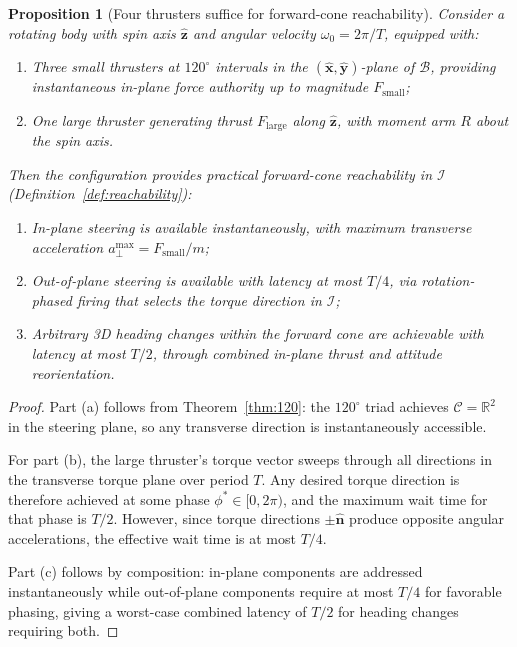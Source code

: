 \documentclass{article}
\newtheorem{proposition}{Proposition}
\begin{document}
\begin{proposition}[Four thrusters suffice for forward-cone reachability]
\label{prop:four_thruster_reachability}
Consider a rotating body with spin axis $\hat{\mathbf{z}}$ and angular velocity $\omega_0 = 2\pi/T$, equipped with:
\begin{enumerate}
\item[\textup{(i)}] Three small thrusters at $120^\circ$ intervals in the $(\hat{\mathbf{x}}, \hat{\mathbf{y}})$-plane of $\mathcal{B}$, providing instantaneous in-plane force authority up to magnitude $F_{\mathrm{small}}$;
\item[\textup{(ii)}] One large thruster generating thrust $F_{\mathrm{large}}$ along $\hat{\mathbf{z}}$, with moment arm $R$ about the spin axis.
\end{enumerate}
Then the configuration provides practical forward-cone reachability in $\mathcal{I}$ (Definition~\ref{def:reachability}):
\begin{enumerate}
\item[\textup{(a)}] \emph{In-plane steering} is available instantaneously, with maximum transverse acceleration $a_\perp^{\max} = F_{\mathrm{small}}/m$;
\item[\textup{(b)}] \emph{Out-of-plane steering} is available with latency at most $T/4$, via rotation-phased firing that selects the torque direction in $\mathcal{I}$;
\item[\textup{(c)}] \emph{Arbitrary 3D heading changes} within the forward cone are achievable with latency at most $T/2$, through combined in-plane thrust and attitude reorientation.
\end{enumerate}
\end{proposition}

\begin{proof}
Part (a) follows from Theorem~\ref{thm:120}: the $120^\circ$ triad achieves $\mathcal{C} = \mathbb{R}^2$ in the steering plane, so any transverse direction is instantaneously accessible.

For part (b), the large thruster's torque vector sweeps through all directions in the transverse torque plane over period $T$. Any desired torque direction is therefore achieved at some phase $\phi^* \in [0, 2\pi)$, and the maximum wait time for that phase is $T/2$. However, since torque directions $\pm\hat{\mathbf{n}}$ produce opposite angular accelerations, the effective wait time is at most $T/4$.

Part (c) follows by composition: in-plane components are addressed instantaneously while out-of-plane components require at most $T/4$ for favorable phasing, giving a worst-case combined latency of $T/2$ for heading changes requiring both.
\end{proof}
\end{document}
